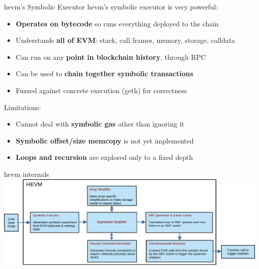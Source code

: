 \documentclass[aspectratio=169]{beamer}
\begin{document}
\begin{frame}{hevm's Symbolic Executor}
hevm's symbolic executor is very powerful:
\begin{itemize}
\item \textbf{Operates on bytecode} so runs everything deployed to the chain
\item Understands \textbf{all of EVM}: stack, call frames, memory, storage, calldata
\item Can run on any \textbf{point in blockchain history}, through RPC
\item Can be used to \textbf{chain together symbolic transactions}
\item Fuzzed against concrete execution (geth) for correctness
\end{itemize}
\bigskip

Limitations:
\begin{itemize}
\item Cannot deal with \textbf{symbolic gas} other than ignoring it
\item \textbf{Symbolic offset/size memcopy} is not yet implemented
\item \textbf{Loops and recursion} are explored only to a fixed depth
\end{itemize}
\end{frame}

\begin{frame}{hevm internals}
\centering
\includegraphics[scale=0.6]{hevm-overview}

\end{frame}
\end{document}

